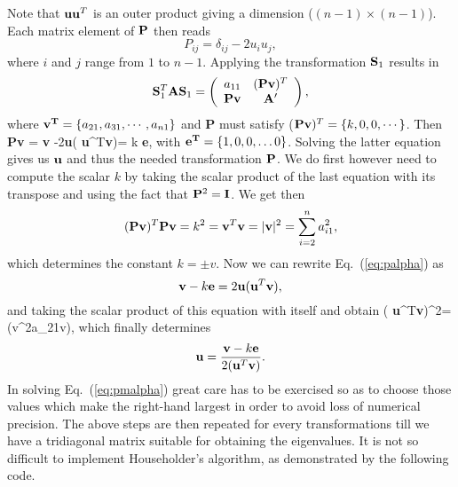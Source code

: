  Note that ${\bf u}{\bf u}^T$ is an outer product giving a
dimension ($(n-1) \times (n-1)$). 
Each matrix element of ${\bf P}$ then reads
%
\[
   P_{ij}=\delta_{ij}-2u_iu_j,
\]
%
where $i$ and $j$ range from $1$ to $n-1$. Applying the transformation  
${\bf S}_1$ results in 
\[
   {\bf S}_1^T{\bf A}{\bf S}_1 =  \left( \begin{array}{cc} a_{11} & ({\bf Pv})^T \\
                              {\bf Pv}& {\bf A}' \end{array} \right) ,
\]
%
where ${\bf v^{T}} = \{a_{21}, a_{31},\cdots, a_{n1}\}$ and {\bf P}
must satisfy (${\bf Pv})^{T} = \{k, 0, 0,\cdots \}$. Then
%
\be
    {\bf Pv} = {\bf v} -2{\bf u}( {\bf u}^T{\bf v})= k {\bf e},
    \label{eq:palpha}
\ee
with ${\bf e^{T}} = \{1,0,0,\dots 0\}$.
Solving the latter equation gives us ${\bf u}$ and thus the needed transformation
${\bf P}$. We do first however need to compute the scalar $k$ by taking the scalar
product of the last equation with its transpose and using the fact that ${\bf P}^2={\bf I}$.
We get then
%
\[
   ({\bf Pv})^T{\bf Pv} = k^{2} = {\bf v}^T{\bf v}=
   |{\bf v}|^2 = \sum_{i=2}^{n}a_{i1}^2,
\]
%
which determines the constant $ k = \pm v$. Now we can rewrite Eq.\ (\ref{eq:palpha})
as 
\[
    {\bf v} - k{\bf e} = 2{\bf u}( {\bf u}^T{\bf v}),
\]
and taking the scalar product of this equation with itself and obtain
( {\bf u}^T{\bf v})^2=(v^2\pm a_{21}v),
    \label{eq:pmalpha}
\ee
which finally determines 
\[
    {\bf u}=\frac{{\bf v}-k{\bf e}}{2( {\bf u}^T{\bf v})}.
\]
In solving Eq.\ (\ref{eq:pmalpha}) great care has to be exercised so as to choose
those values which make the right-hand largest in order to avoid loss of numerical
precision. 
The above steps are then repeated for every transformations till we have a 
tridiagonal matrix suitable for obtaining the eigenvalues.  
It is not so difficult to implement Householder's algorithm, as demonstrated by the following code.
